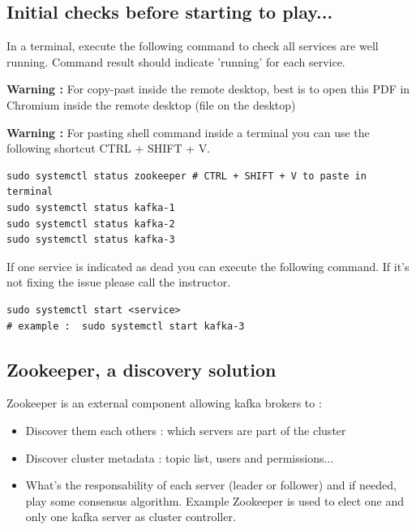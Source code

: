 \documentclass{article}
\newenvironment{warning}
    { \begin{mdframed}[backgroundcolor=blue!20] \textbf{Warning : } }
    {  \end{mdframed}}
\newenvironment{code}
    { \begin{mdframed} }    {  \end{mdframed}}
\begin{document}
\subsection{Initial checks before starting to play...}
In a terminal, execute the following command to check all services are well running. Command result should indicate 'running' for each service. 

\begin{warning}
For copy-past inside the remote desktop, best is to open this PDF in Chromium inside the remote desktop (file on the desktop)
\end{warning}

\begin{warning}
For pasting shell command inside a terminal you can use the following shortcut CTRL + SHIFT + V.
\end{warning}


\begin{code}
    \begin{verbatim}
sudo systemctl status zookeeper # CTRL + SHIFT + V to paste in terminal
sudo systemctl status kafka-1
sudo systemctl status kafka-2
sudo systemctl status kafka-3\end{verbatim}
\end{code}

If one service is indicated as dead you can execute the following command. If it's not fixing the issue please call the instructor.

\begin{code}
    \begin{verbatim}
sudo systemctl start <service>
# example :  sudo systemctl start kafka-3
    \end{verbatim}
\end{code}

\subsection{Zookeeper, a discovery solution}
Zookeeper is an external component allowing kafka brokers to : 
\begin{itemize}
\item Discover them each others : which servers are part of the cluster 
\item Discover cluster metadata : topic list, users and permissions...
\item What's the responsability of each server (leader or follower) and if needed, play some consensus algorithm. Example Zookeeper is used to elect one and only one kafka server as cluster controller.
\end{itemize}
\end{document}
